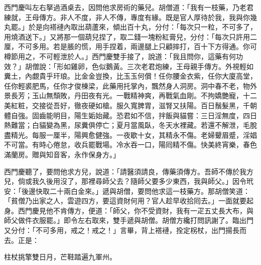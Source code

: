 西門慶叫左右拏過酒桌去，因問他求房術的藥兒。胡僧道：「我有一枝藥，乃老君練就，王母傳方。非人不度，非人不傳，專度有緣。既是官人厚待於我，我與你幾丸罷。」於是向褡褳內取出葫蘆來，傾出百十丸，分付：「每次只一粒，不可多了，用燒酒送下。」又將那一個葫兒捏了，取二錢一塊粉紅膏兒，分付：「每次只許用二厘，不可多用。若是脹的慌，用手捏着，兩邊腿上只顧摔打，百十下方得通。你可樽節用之，不可輕泄於人。」西門慶雙手接了，說道：「我且問你，這藥有何功效？」胡僧說：「形如雞卵，色似鵝黃。三次老君炮練，王母親手傳方。外視輕如糞土，內覷貴乎玕琅。比金金豈換，比玉玉何償！任你腰金衣紫，任你大廈高堂，任你輕裘肥馬，任你才俊棟梁，此藥用托掌內，飄然身人洞房。洞中春不老，物外景長芳；玉山無頹敗，丹田夜有光。一戰精神爽，再戰氣血剛。不拘嬌艷寵，十二美紅粧，交接從吾好，徹夜硬如槍。服久寬脾胃，滋腎又扶陽。百日鬚髮黑，千朝體自強。固齒能明目，陽生姤始藏。恐君如不信，拌飯與貓嘗：三日淫無度，四日熱難當；白貓變為黑，尿糞俱停亡；夏月當風臥，冬天水裡藏。若還不解泄，毛脫盡精光。每服一厘半，陽興愈健強。一夜歇十女，其精永不傷。老婦顰眉蹙，淫娼不可當。有時心倦怠，收兵罷戰場。冷水吞一口，陽囘精不傷。快美終宵樂，春色滿蘭房。贈與知音客，永作保身方。」

西門慶聽了，要問他求方兒，說道：「請醫須請良，傳藥須傳方。吾師不傳於我方兒，倘或我久後用沒了，那裡尋師父去？隨師父要多少東西，我與師父。」因令玳安：「後邊快取二十兩白金來。」遞與胡僧，要問他求這一枝藥方。那胡僧笑道：「貧僧乃出家之人，雲遊四方，要這資財何用？{}官人趁早收拾囘去。」一面就要起身。西門慶見他不肯傳方，便道：「師父，你不受資財，我有一疋五丈長大布，與師父做件衣服罷。」即令左右取來，雙手遞與胡僧。胡僧方纔打問訊謝了。臨出門又分付：「不可多用，戒之！戒之！」言畢，背上褡褳，拴定柺杖，出門揚長而去。正是：

柱杖挑擎雙日月，芒鞋踏遍九軍州。

